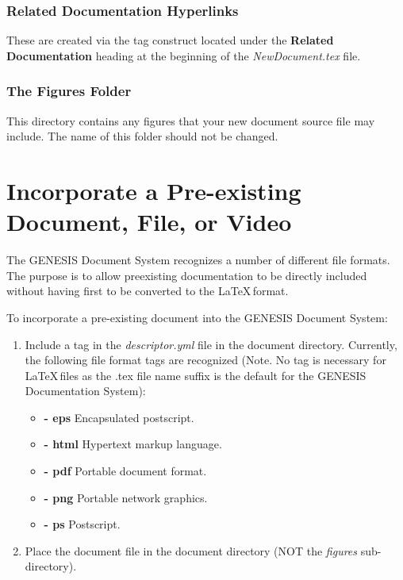 \documentclass[12pt]{article}
\begin{document}
\subsubsection*{Related Documentation Hyperlinks}

These are created via the tag construct located under the {\bf Related Documentation} heading at the beginning of the {\it NewDocument.tex} file. 

\subsubsection*{The Figures Folder}

This directory contains any figures that your new document source file may include. The name of this folder should not be changed.

\section*{Incorporate a Pre-existing Document, File, or Video}

The GENESIS Document System recognizes a number of different file formats. The purpose is to allow preexisting documentation to be directly included without having first to be converted to the \LaTeX\,format.

To incorporate a pre-existing document into the GENESIS Document System:

\begin{enumerate}

\item Include a tag in the {\it descriptor.yml} file in the document directory. Currently, the following file format tags are recognized (Note. No tag is necessary for  \LaTeX\,files as the .tex file name suffix is the default for the GENESIS Documentation System):

\begin{itemize}

\item[]{\bf - eps} Encapsulated postscript.
\item[]{\bf - html} Hypertext markup language.
\item[]{\bf - pdf} Portable document format.
\item[]{\bf - png} Portable network graphics.
\item[]{\bf - ps} Postscript.

\end{itemize}

\item Place the document file in the document directory (NOT the {\it figures} sub-directory).

\end{enumerate}
\end{document}
